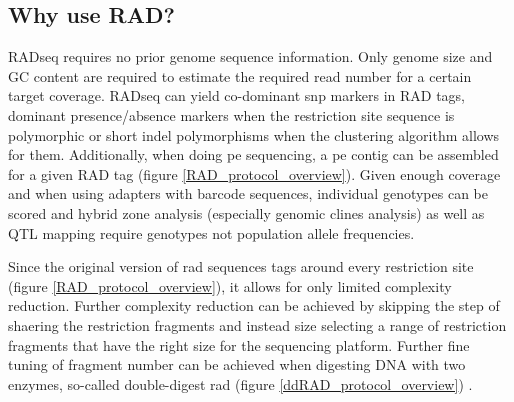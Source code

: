\documentclass[a4paper,12pt,times,print,index, custombib]{PhDThesisPSnPDF}\usepackage[]{graphicx}\usepackage[]{color}
\begin{document}
\subsection{Why use RAD?}
RADseq requires no prior genome sequence information. Only genome size and GC content are required to estimate the required read number for a certain target coverage. 
RADseq can yield co-dominant \gls{snp} markers in \glspl{RAD tag}, dominant presence/absence markers when the restriction site sequence is polymorphic or short indel polymorphisms when the clustering algorithm allows for them. Additionally, when doing \gls{pe} sequencing, a \gls{pe} contig can be assembled for a given \gls{RAD tag} (figure \ref{RAD_protocol_overview}).
Given enough coverage and when using adapters with barcode sequences, individual genotypes can be scored and hybrid zone analysis (especially genomic clines analysis) as well as QTL mapping require genotypes not population allele frequencies. 

Since the original version of \gls{rad} sequences tags around every restriction site (figure \ref{RAD_protocol_overview}), it allows for only limited complexity reduction. Further complexity reduction can be achieved by skipping the step of shaering the restriction fragments and instead size selecting a range of restriction fragments that have the right size for the sequencing platform. Further fine tuning of fragment number can be achieved when digesting DNA with two enzymes, so-called double-digest \gls{rad} (figure \ref{ddRAD_protocol_overview}) \citep{Peterson2012}.
\end{document}
